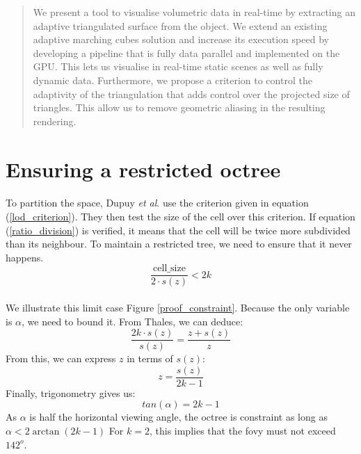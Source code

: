 \documentclass[twocolumn]{cgi2015_latex/svjour3}          %
\begin{document}
\begin{abstract}
We present a tool to visualise volumetric data in real-time by extracting an adaptive triangulated surface from the object.
We extend an existing adaptive marching cubes solution and increase its execution speed by developing a pipeline that is fully data parallel and implemented on the GPU.
This lets us visualise in real-time static scenes as well as fully dynamic data.
Furthermore, we propose a criterion to control the adaptivity of the triangulation that adds control over the projected size of triangles.
This allow us to remove geometric aliasing in the resulting rendering.
\end{abstract}







\appendix

\section{Ensuring a restricted octree}

\paragraph{}
To partition the space, Dupuy \textit{et al}. use the criterion given in equation (\ref{lod_criterion}).
They then test the size of the cell over this criterion.
If equation (\ref{ratio_division}) is verified, it means that the cell will be twice more subdivided than its neighbour.
To maintain a restricted tree, we need to ensure that it never happens.\\
\begin{equation}
\frac{\mathrm{cell\_size}}{2 \cdot s(z)} < 2k
\label{ratio_division}
\end{equation}

\paragraph{}
We illustrate this limit case Figure \ref{proof_constraint}.
Because the only variable is $\alpha$, we need to bound it.
From Thales, we can deduce:
$$
\frac{2k \cdot s(z)}{s(z)} = \frac{z + s(z)}{z}
$$
From this, we can express $z$ in terms of $s(z)$:
$$
z = \frac{s(z)}{2k - 1}
$$
Finally, trigonometry gives us:
$$
tan(\alpha) = 2k - 1
$$
As $\alpha$ is half the horizontal viewing angle, the octree is constraint as long as $\alpha < 2\arctan(2k - 1)$
For $k = 2$, this implies that the fovy must not exceed $142^o$.
\end{document}
